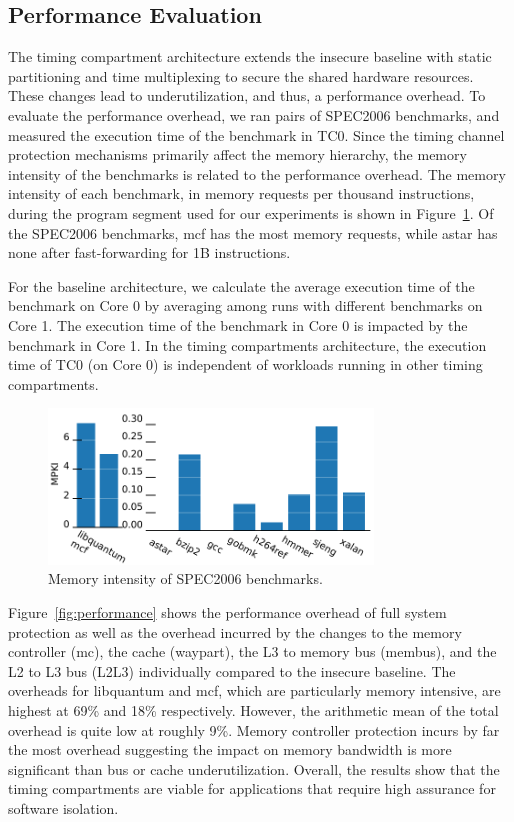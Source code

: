 \subsection{Performance Evaluation}

The timing compartment architecture extends the insecure baseline with
static partitioning and time multiplexing to secure the shared hardware 
resources. These changes lead to underutilization, and thus, a performance
overhead. To evaluate the performance overhead, we ran pairs of
SPEC2006 benchmarks, and measured the execution time of the benchmark
in TC0. Since the timing channel protection mechanisms primarily affect the memory 
hierarchy, the memory intensity of the benchmarks is related to the performance 
overhead.
The memory intensity of each benchmark, in memory requests per thousand 
instructions, during the program segment used for our experiments is shown in
Figure~\ref{fig:memstudy}. Of the SPEC2006 benchmarks, mcf has the most memory 
requests, while astar has none after fast-forwarding for 1B instructions.

For the baseline architecture, we calculate the average execution time of the 
benchmark on Core 0 by averaging among runs with different benchmarks on Core 1. 
The execution time of the benchmark in Core 0 is impacted by the benchmark in 
Core 1. In the timing compartments architecture, the execution time of TC0 (on 
Core 0) is independent of workloads running in other timing compartments.

\begin{figure}
    \begin{center}
        \includegraphics[width=3.4in]{figs/mpki_merged.pdf}
        \caption{Memory intensity of SPEC2006 benchmarks.}
        \label{fig:memstudy}
    \end{center}
\end{figure}

Figure~\ref{fig:performance} shows the performance overhead of full system 
protection as well as the overhead incurred by the changes to the memory 
controller (mc), the cache (waypart), the L3 to memory bus (membus), and the L2 
to L3 bus (L2L3) individually compared to the insecure baseline. The
overheads for libquantum and mcf, which are particularly memory intensive, are 
highest at 69\% and 18\% respectively. However, the arithmetic mean of the 
total overhead is quite low at roughly 9\%. Memory controller protection incurs 
by far the most overhead suggesting the impact on memory bandwidth is more 
significant than bus or cache underutilization. Overall, the results show that 
the timing compartments are viable for applications that require high assurance 
for software isolation.

